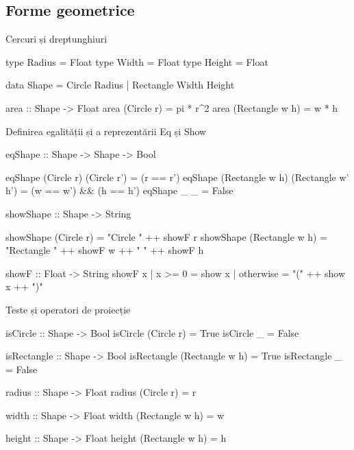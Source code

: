 \documentclass[xcolor=pdftex,romanian,colorlinks]{beamer}
\begin{document}
\subsection{Forme geometrice}

\begin{frame}[fragile]{Cercuri și dreptunghiuri}
\begin{asciihs}
  type   Radius   =   Float
  type   Width    =   Float
  type   Height   =   Float

  data   Shape    =   Circle Radius
                  |   Rectangle Width Height

  area :: Shape -> Float
  area (Circle r) = pi * r^2
  area (Rectangle w h) = w * h
\end{asciihs}
\end{frame}


\begin{frame}[fragile]{Definirea egalității și a reprezentării}
{Eq și Show}
\begin{asciihs}
  eqShape :: Shape -> Shape -> Bool
\end{asciihs}
\vspace{-2ex}
\begin{asciihs}
  eqShape (Circle r) (Circle r')  = (r == r')
  eqShape (Rectangle w h) (Rectangle w' h') = (w == w') && (h == h')
  eqShape _          _            = False

\end{asciihs}
\begin{asciihs}
  showShape :: Shape -> String
\end{asciihs}
\vspace{-2ex}
\begin{asciihs}
  showShape (Circle r) = "Circle " ++ showF r
  showShape (Rectangle w h) = "Rectangle " ++ showF w 
      ++ " " ++ showF h

  showF :: Float -> String
  showF x | x >= 0     = show x
          | otherwise = "(" ++ show x ++ ")"
\end{asciihs}
\end{frame}

\begin{frame}[fragile]{Teste și operatori de proiecție}
\begin{asciihs}
  isCircle :: Shape -> Bool
  isCircle (Circle r) = True
  isCircle _          = False

  isRectangle :: Shape -> Bool
  isRectangle (Rectangle w h) = True
  isRectangle _          = False

  radius :: Shape -> Float
  radius (Circle r) = r

  width :: Shape -> Float
  width (Rectangle w h) = w

  height :: Shape -> Float
  height (Rectangle w h) = h
\end{asciihs}
\end{frame}
\end{document}
